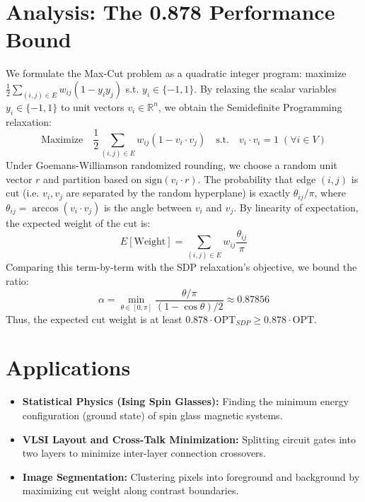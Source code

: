 \documentclass[11pt,oneside]{book}
\begin{document}
\section{Analysis: The 0.878 Performance Bound}
We formulate the Max-Cut problem as a quadratic integer program: maximize $\frac{1}{2} \sum_{(i,j) \in E} w_{ij} (1 - y_i y_j)$ s.t. $y_i \in \{-1, 1\}$.
By relaxing the scalar variables $y_i \in \{-1, 1\}$ to unit vectors $v_i \in \mathbb{R}^n$, we obtain the Semidefinite Programming relaxation:
\[
\text{Maximize} \quad \frac{1}{2} \sum_{(i,j) \in E} w_{ij} (1 - v_i \cdot v_j) \quad \text{s.t.} \quad v_i \cdot v_i = 1 \; (\forall i \in V)
\]
Under Goemans-Williamson randomized rounding, we choose a random unit vector $r$ and partition based on $\text{sign}(v_i \cdot r)$. The probability that edge $(i, j)$ is cut (i.e. $v_i, v_j$ are separated by the random hyperplane) is exactly $\theta_{ij}/\pi$, where $\theta_{ij} = \arccos(v_i \cdot v_j)$ is the angle between $v_i$ and $v_j$.
By linearity of expectation, the expected weight of the cut is:
\[
E[\text{Weight}] = \sum_{(i,j) \in E} w_{ij} \frac{\theta_{ij}}{\pi}
\]
Comparing this term-by-term with the SDP relaxation's objective, we bound the ratio:
\[
\alpha = \min_{\theta \in [0, \pi]} \frac{\theta/\pi}{(1 - \cos \theta)/2} \approx 0.87856
\]
Thus, the expected cut weight is at least $0.878 \cdot \text{OPT}_{SDP} \ge 0.878 \cdot \text{OPT}$.

\section{Applications}
\begin{itemize}
    \item \textbf{Statistical Physics (Ising Spin Glasses):} Finding the minimum energy configuration (ground state) of spin glass magnetic systems.
    \item \textbf{VLSI Layout and Cross-Talk Minimization:} Splitting circuit gates into two layers to minimize inter-layer connection crossovers.
    \item \textbf{Image Segmentation:} Clustering pixels into foreground and background by maximizing cut weight along contrast boundaries.
\end{itemize}
\end{document}
